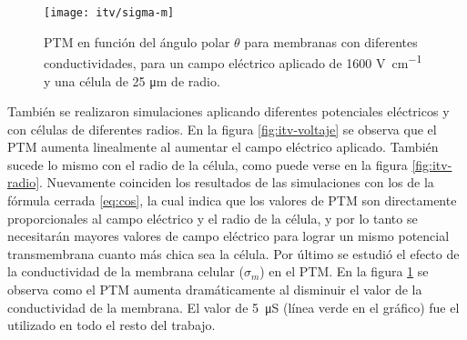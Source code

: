 \clearpage


\begin{figure}[h!]\centering
	\texttt{[image: itv/sigma-m]}
	\caption{PTM en función del ángulo polar $\theta$ para membranas con diferentes conductividades, para un campo eléctrico aplicado de 1600 \si{\volt\per\centi\metre} y una célula de 25 \si{\micro\metre} de radio.}
	\label{fig:sigma-m}
\end{figure}

También se realizaron simulaciones aplicando diferentes potenciales eléctricos y con células de diferentes radios. En la figura \ref{fig:itv-voltaje} se observa que el PTM aumenta linealmente al aumentar el campo eléctrico aplicado. También sucede lo mismo con el radio de la célula, como puede verse en la figura \ref{fig:itv-radio}. Nuevamente coinciden los resultados de las simulaciones con los de la fórmula cerrada \ref{eq:cos}, la cual indica que los valores de PTM son directamente proporcionales al campo eléctrico y el radio de la célula, y por lo tanto se necesitarán mayores valores de campo eléctrico para lograr un mismo potencial transmembrana cuanto más chica sea la célula. Por último se estudió el efecto de la conductividad de la membrana celular ($\sigma_m$) en el PTM. En la figura \ref{fig:sigma-m} se observa como el PTM aumenta dramáticamente al disminuir el valor de la conductividad de la membrana. El valor de \mbox{5 \si{\micro\siemens}} (línea verde en el gráfico) fue el utilizado en todo el resto del trabajo.
